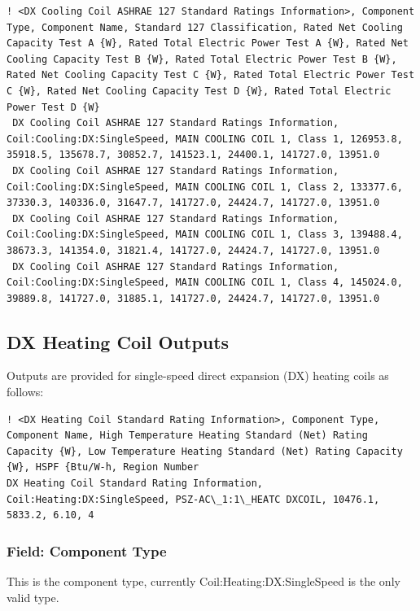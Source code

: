\begin{lstlisting}
! <DX Cooling Coil ASHRAE 127 Standard Ratings Information>, Component Type, Component Name, Standard 127 Classification, Rated Net Cooling Capacity Test A {W}, Rated Total Electric Power Test A {W}, Rated Net Cooling Capacity Test B {W}, Rated Total Electric Power Test B {W}, Rated Net Cooling Capacity Test C {W}, Rated Total Electric Power Test C {W}, Rated Net Cooling Capacity Test D {W}, Rated Total Electric Power Test D {W}
 DX Cooling Coil ASHRAE 127 Standard Ratings Information, Coil:Cooling:DX:SingleSpeed, MAIN COOLING COIL 1, Class 1, 126953.8, 35918.5, 135678.7, 30852.7, 141523.1, 24400.1, 141727.0, 13951.0
 DX Cooling Coil ASHRAE 127 Standard Ratings Information, Coil:Cooling:DX:SingleSpeed, MAIN COOLING COIL 1, Class 2, 133377.6, 37330.3, 140336.0, 31647.7, 141727.0, 24424.7, 141727.0, 13951.0
 DX Cooling Coil ASHRAE 127 Standard Ratings Information, Coil:Cooling:DX:SingleSpeed, MAIN COOLING COIL 1, Class 3, 139488.4, 38673.3, 141354.0, 31821.4, 141727.0, 24424.7, 141727.0, 13951.0
 DX Cooling Coil ASHRAE 127 Standard Ratings Information, Coil:Cooling:DX:SingleSpeed, MAIN COOLING COIL 1, Class 4, 145024.0, 39889.8, 141727.0, 31885.1, 141727.0, 24424.7, 141727.0, 13951.0
\end{lstlisting}

\subsection{DX Heating Coil Outputs}\label{dx-heating-coil-outputs}

Outputs are provided for single-speed direct expansion (DX) heating coils as follows:

\begin{lstlisting}
! <DX Heating Coil Standard Rating Information>, Component Type, Component Name, High Temperature Heating Standard (Net) Rating Capacity {W}, Low Temperature Heating Standard (Net) Rating Capacity {W}, HSPF {Btu/W-h, Region Number
DX Heating Coil Standard Rating Information, Coil:Heating:DX:SingleSpeed, PSZ-AC\_1:1\_HEATC DXCOIL, 10476.1, 5833.2, 6.10, 4
\end{lstlisting}

\subsubsection{Field: Component Type}\label{field-component-type-7}

This is the component type, currently Coil:Heating:DX:SingleSpeed is the only valid type.

